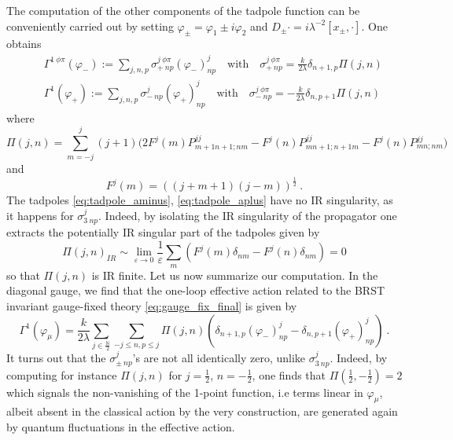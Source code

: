 \documentclass[11pt]{book}
\theoremstyle{break}
\begin{document}
The computation of the other components of the tadpole function can be conveniently carried out by setting $\varphi_\pm = \varphi_1 \pm i \varphi_2$ and  $D_\pm \cdot = i \lambda^{-2} [x_\pm, \cdot]$. One obtains
%
\begin{eqnarray}
&& \Gamma^{1\ \phi\pi}(\varphi_-) := \sum_{j,n,p}\sigma^{j\ \phi\pi}_{+\ np}(\varphi_-)^j_{np} 
\quad \mbox{with} \quad
\sigma^{j\ \phi\pi}_{+\ np} = \frac{k}{2\lambda}\delta_{n+1,p}\Pi(j,n) \label{eq:tadpole_aminus} \\
%
&& \Gamma^{1}(\varphi_+) := \sum_{j,n,p}\sigma^{j}_{-\ np}(\varphi_+)^j_{np} 
\quad \mbox{with} \quad
\sigma^{j\ \phi\pi}_{-\ np} = -\frac{k}{2\lambda}\delta_{n,p+1}\Pi(j,n) \label{eq:tadpole_aplus} 
\end{eqnarray}
%
where
%
\begin{equation*}
\Pi(j,n) = \sum_{m=-j}^j (j+1) \bigg(2F^j(m)P^{jj}_{m+1n+1;nm}-F^j(n)P^{jj}_{mn+1;n+1m}-F^j(n)P^{jj}_{mn;nm}\bigg) 
\end{equation*}
%
and 
\begin{equation}
F^j(m) = \left((j+m+1)(j-m)\right)^{\frac12} \ .
\end{equation}
%
The tadpoles \eqref{eq:tadpole_aminus}, \eqref{eq:tadpole_aplus} have no IR singularity, as it happens for $\sigma^{j}_{3\ np}$. Indeed, by isolating the IR singularity of the propagator one extracts the potentially IR singular part of the tadpoles given by
%
\begin{equation}
\Pi(j,n)_{IR}\sim\lim_{\varepsilon\to0}\frac{1}{\varepsilon}\sum_m(F^j(m)\delta_{nm}-F^j(n)\delta_{nm})=0
\end{equation}
%
so that $\Pi(j,n)$ is IR finite. Let us now summarize our computation. In the diagonal gauge, we find that the one-loop effective action related to the BRST invariant gauge-fixed theory \eqref{eq:gauge_fix_final} is given by
%
\begin{equation*}
\Gamma^1(\varphi_\mu)=\frac{k}{2\lambda}\sum_{j\in\frac{\mathbb{N}}{2}}\sum_{-j\le n,p\le j}\Pi(j,n)(\delta_{n+1,p}(\varphi_-)^j_{np}-\delta_{n,p+1}(\varphi_+)^j_{np}) \ .
\end{equation*}
%
It turns out that the $\sigma^j_{\pm\ np}$'s are not all identically zero, unlike $\sigma^j_{3\ np}$. Indeed, by computing for instance $\Pi(j,n)$ for $j=\frac{1}{2}$, $n=-\frac{1}{2}$, one finds that $\Pi(\frac{1}{2},-\frac{1}{2})=2$ which signals the non-vanishing of the 1-point function, i.e terms linear in $\varphi_\mu$, albeit absent in the classical action by the very construction, are generated again by quantum fluctuations in the effective action.
\end{document}
